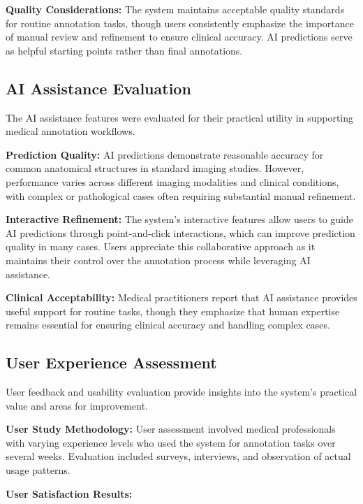 \textbf{Quality Considerations:} The system maintains acceptable quality standards for routine annotation tasks, though users consistently emphasize the importance of manual review and refinement to ensure clinical accuracy. AI predictions serve as helpful starting points rather than final annotations.

\subsection{AI Assistance Evaluation}

The AI assistance features were evaluated for their practical utility in supporting medical annotation workflows.

\textbf{Prediction Quality:} AI predictions demonstrate reasonable accuracy for common anatomical structures in standard imaging studies. However, performance varies across different imaging modalities and clinical conditions, with complex or pathological cases often requiring substantial manual refinement.

\textbf{Interactive Refinement:} The system's interactive features allow users to guide AI predictions through point-and-click interactions, which can improve prediction quality in many cases. Users appreciate this collaborative approach as it maintains their control over the annotation process while leveraging AI assistance.

\textbf{Clinical Acceptability:} Medical practitioners report that AI assistance provides useful support for routine tasks, though they emphasize that human expertise remains essential for ensuring clinical accuracy and handling complex cases.

\subsection{User Experience Assessment}

User feedback and usability evaluation provide insights into the system's practical value and areas for improvement.

\textbf{User Study Methodology:} User assessment involved medical professionals with varying experience levels who used the system for annotation tasks over several weeks. Evaluation included surveys, interviews, and observation of actual usage patterns.

\textbf{User Satisfaction Results:}

